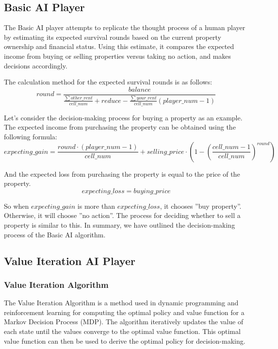\documentclass{article}
\begin{document}
\subsection{Basic AI Player}
The Basic AI player attempts to replicate the thought process of a human player by estimating its expected survival rounds based on the current property ownership and financial status. Using this estimate, it compares the expected income from buying or selling properties versus taking no action, and makes decisions accordingly.

The calculation method for the expected survival rounds is as follows:
\begin{equation*}
    round = \frac{balance}{\frac{\sum other\_rent}{cell\_num}+reduce-\frac{\sum your\_rent}{cell\_num}(player\_num-1)}
\end{equation*}

Let's consider the decision-making process for buying a property as an example. The expected income from purchasing the property can be obtained using the following formula:
\begin{equation*}
    expecting\_gain = \frac{round\cdot (player\_num-1)}{cell\_num}+selling\_price\cdot \left(1-\left(\frac{cell\_num-1}{cell\_num}\right)^{round}\right)
\end{equation*}

And the expected loss from purchasing the property is equal to the price of the property.
\begin{equation*}
    expecting\_loss = buying\_price
\end{equation*}

So when $expecting\_gain$ is more than $expecting\_loss$, it chooses ''buy property''. Otherwise, it will choose ''no action''. The process for deciding whether to sell a property is similar to this. In summary, we have outlined the decision-making process of the Basic AI algorithm.

\subsection{Value Iteration AI Player}
\subsubsection{Value Iteration Algorithm}

The Value Iteration Algorithm is a method used in dynamic programming and reinforcement learning for computing the optimal policy and value function for a Markov Decision Process (MDP). The algorithm iteratively updates the value of each state until the values converge to the optimal value function. This optimal value function can then be used to derive the optimal policy for decision-making.
\end{document}
